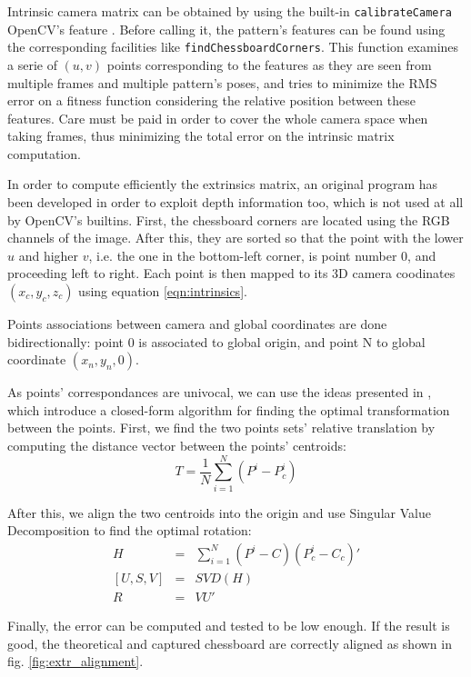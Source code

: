 Intrinsic camera matrix can be obtained by using the built-in
\texttt{calibrateCamera} OpenCV's feature %
. Before calling it, the pattern's features can be found using the corresponding
facilities like \texttt{findChessboardCorners}. This function examines a serie
of $(u,v)$ points corresponding to the features as they are seen from multiple
frames and multiple pattern's poses, and tries to minimize the RMS error on a
fitness function considering the relative position between these features. Care
must be paid in order to cover the whole camera space when taking frames, thus
minimizing the total error on the intrinsic matrix computation.

In order to compute efficiently the extrinsics matrix, an original program has
been developed in order to exploit depth information too, which is not used at
all by OpenCV's builtins. First, the chessboard corners are located using the RGB
channels of the image. After this, they are sorted so that the point with the
lower $u$ and higher $v$, i.e. the one in the bottom-left corner, is point
number 0, and proceeding left to right. Each point is then mapped to its 3D
camera coodinates $(x_c,y_c,z_c)$ using equation \ref{eqn:intrinsics}. 

Points associations between camera and global coordinates are done
bidirectionally: point 0 is associated to global origin, and point N to global
coordinate $(x_n, y_n, 0)$.

As points' correspondances are univocal, we can use the ideas presented in
\cite{extrinsics-algorithm}, which introduce a closed-form algorithm for finding
the optimal transformation between the points. First, we find the two points sets' relative
translation by computing the distance vector between the points' centroids:
\begin{equation}
  T=\frac{1}{N}\sum_{i=1}^{N}(P^i-P_c^i)
\end{equation}

After this, we align the two centroids into the origin and use Singular Value
Decomposition to find the optimal rotation:
\begin{eqnarray}
  H &=& \sum_{i=1}^{N} (P^i - C)(P_c^i - C_c)' \\
  \left[U,S,V\right] &=& SVD(H) \\
  R &=& VU'
\end{eqnarray}

Finally, the error can be computed and tested to be low enough. If the result is
good, the theoretical and captured chessboard are correctly aligned as shown in
fig. \ref{fig:extr_alignment}.

